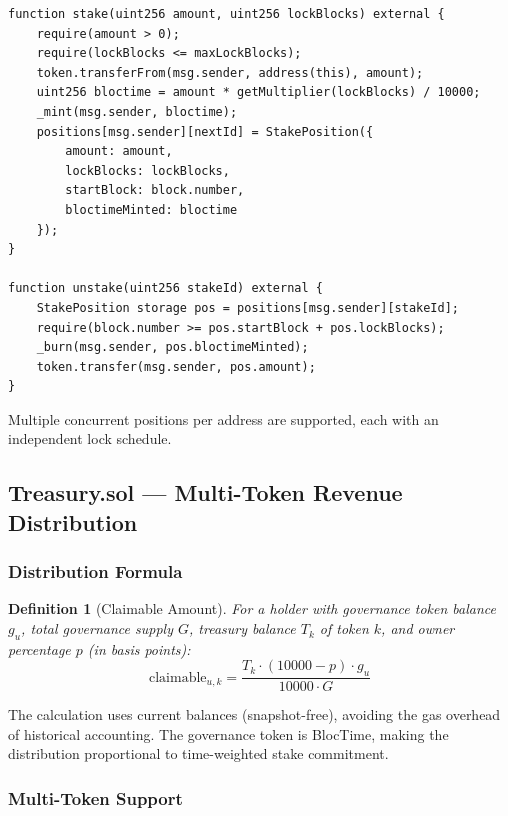 \documentclass[11pt,a4paper]{article}
\newtheorem{definition}{Definition}[section]
\begin{document}
\begin{lstlisting}[style=solidity]
function stake(uint256 amount, uint256 lockBlocks) external {
    require(amount > 0);
    require(lockBlocks <= maxLockBlocks);
    token.transferFrom(msg.sender, address(this), amount);
    uint256 bloctime = amount * getMultiplier(lockBlocks) / 10000;
    _mint(msg.sender, bloctime);
    positions[msg.sender][nextId] = StakePosition({
        amount: amount,
        lockBlocks: lockBlocks,
        startBlock: block.number,
        bloctimeMinted: bloctime
    });
}

function unstake(uint256 stakeId) external {
    StakePosition storage pos = positions[msg.sender][stakeId];
    require(block.number >= pos.startBlock + pos.lockBlocks);
    _burn(msg.sender, pos.bloctimeMinted);
    token.transfer(msg.sender, pos.amount);
}
\end{lstlisting}

Multiple concurrent positions per address are supported, each with an independent lock schedule.

\subsection{Treasury.sol --- Multi-Token Revenue Distribution}

\subsubsection{Distribution Formula}

\begin{definition}[Claimable Amount]
For a holder with governance token balance $g_u$, total governance supply $G$, treasury balance $T_k$ of token $k$, and owner percentage $p$ (in basis points):
\begin{equation}
\text{claimable}_{u,k} = \frac{T_k \cdot (10000 - p) \cdot g_u}{10000 \cdot G}
\label{eq:treasury}
\end{equation}
\end{definition}

The calculation uses current balances (snapshot-free), avoiding the gas overhead of historical accounting. The governance token is BlocTime, making the distribution proportional to time-weighted stake commitment.

\subsubsection{Multi-Token Support}
\end{document}
